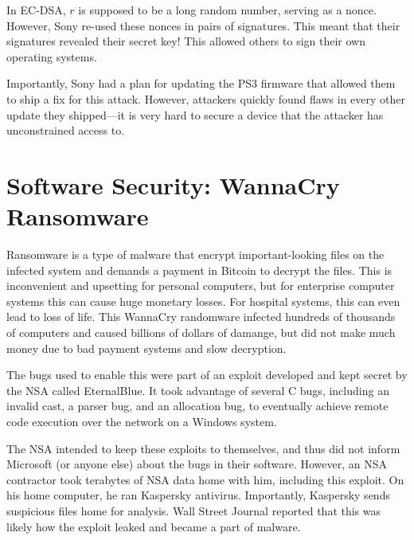 In EC-DSA, $r$ is supposed to be a long random number, serving as a nonce. However, Sony re-used these nonces in pairs of signatures. This meant that their signatures revealed their secret key! This allowed others to sign their own operating systems. 

Importantly, Sony had a plan for updating the PS3 firmware that allowed them to ship a fix for this attack. However, attackers quickly found flaws in every other update they shipped---it is very hard to secure a device that the attacker has unconstrained access to.

\section{Software Security: WannaCry Ransomware}

Ransomware is a type of malware that encrypt important-looking files on the infected system and demands a payment in Bitcoin to decrypt the files. This is inconvenient and upsetting for personal computers, but for enterprise computer systems this can cause huge monetary losses. For hospital systems, this can even lead to loss of life. This WannaCry randomware infected hundreds of thousands of computers and caused billions of dollars of damange, but did not make much money due to bad payment systems and slow decryption. 

The bugs used to enable this were part of an exploit developed and kept secret by the NSA called EternalBlue. It took advantage of several C bugs, including an invalid cast, a parser bug, and an allocation bug, to eventually achieve remote code execution over the network on a Windows system.

The NSA intended to keep these exploits to themselves, and thus did not inform Microsoft (or anyone else) about the bugs in their software. However, an NSA contractor took terabytes of NSA data home with him, including this exploit. On his home computer, he ran Kaspersky antivirus. Importantly, Kaspersky sends suspicious files home for analysis. Wall Street Journal reported that this was likely how the exploit leaked and became a part of malware.

